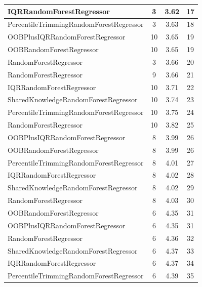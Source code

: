 \begin{table}[h]
\begin{tabular}{|l|c|c|c|}
\textcolor[HTML]{27aeef}{IQRRandomForestRegressor} & 3 & 3.62 & 17 \\ \hline
\textcolor[HTML]{f46a9b}{PercentileTrimmingRandomForestRegressor} & 3 & 3.63 & 18 \\ \hline
\textcolor[HTML]{ede15b}{OOBPlusIQRRandomForestRegressor} & 10 & 3.65 & 19 \\ \hline
\textcolor[HTML]{b33dc6}{OOBRandomForestRegressor} & 10 & 3.65 & 19 \\ \hline
\textcolor[HTML]{87bc45}{RandomForestRegressor} & 3 & 3.66 & 20 \\ \hline
\textcolor[HTML]{87bc45}{RandomForestRegressor} & 9 & 3.66 & 21 \\ \hline
\textcolor[HTML]{27aeef}{IQRRandomForestRegressor} & 10 & 3.71 & 22 \\ \hline
\textcolor[HTML]{ef9b20}{SharedKnowledgeRandomForestRegressor} & 10 & 3.74 & 23 \\ \hline
\textcolor[HTML]{f46a9b}{PercentileTrimmingRandomForestRegressor} & 10 & 3.75 & 24 \\ \hline
\textcolor[HTML]{87bc45}{RandomForestRegressor} & 10 & 3.82 & 25 \\ \hline
\textcolor[HTML]{ede15b}{OOBPlusIQRRandomForestRegressor} & 8 & 3.99 & 26 \\ \hline
\textcolor[HTML]{b33dc6}{OOBRandomForestRegressor} & 8 & 3.99 & 26 \\ \hline
\textcolor[HTML]{f46a9b}{PercentileTrimmingRandomForestRegressor} & 8 & 4.01 & 27 \\ \hline
\textcolor[HTML]{27aeef}{IQRRandomForestRegressor} & 8 & 4.02 & 28 \\ \hline
\textcolor[HTML]{ef9b20}{SharedKnowledgeRandomForestRegressor} & 8 & 4.02 & 29 \\ \hline
\textcolor[HTML]{87bc45}{RandomForestRegressor} & 8 & 4.03 & 30 \\ \hline
\textcolor[HTML]{b33dc6}{OOBRandomForestRegressor} & 6 & 4.35 & 31 \\ \hline
\textcolor[HTML]{ede15b}{OOBPlusIQRRandomForestRegressor} & 6 & 4.35 & 31 \\ \hline
\textcolor[HTML]{87bc45}{RandomForestRegressor} & 6 & 4.36 & 32 \\ \hline
\textcolor[HTML]{ef9b20}{SharedKnowledgeRandomForestRegressor} & 6 & 4.37 & 33 \\ \hline
\textcolor[HTML]{27aeef}{IQRRandomForestRegressor} & 6 & 4.37 & 34 \\ \hline
\textcolor[HTML]{f46a9b}{PercentileTrimmingRandomForestRegressor} & 6 & 4.39 & 35 \\ \hline
\end{tabular}
\end{table}

